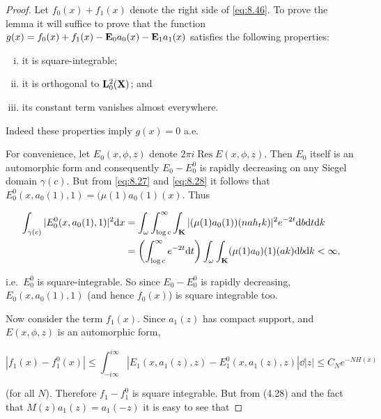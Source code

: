 \begin{proof}

Let $f_{0}(x) + f_{1}(x)$ denote the right side of \eqref{eq:8.46}. To prove the lemma it will suffice to prove that the function $g(x) = f_{0}(x) + f_{1}(x) - \mathbf{E}_{0}a_{0}(x) - \mathbf{E}_{1}a_{1}(x)$ satisfies the following properties:

\begin{enumerate}[(i)]

\item it is square-integrable;

\item it is orthogonal to $\mathbf{L}_{0}^{2}(\mathbf{X})$; and

\item its constant term vanishes almost everywhere.

\end{enumerate}

Indeed these properties imply $g(x) = 0$ a.e.

For convenience, let $E_{0}(x,\phi,z)$ denote $2\pi i\operatorname{Res}E(x,\phi,z)$. Then $E_{0}$ itself is an automorphic form and consequently $E_{0} - E_{0}^{0}$ is rapidly decreasing on any Siegel domain $\gamma(c)$. But from \eqref{eq:8.27} and \eqref{eq:8.28} it follows that $E_{0}^{0}(x,a_{0}(1),1) = (\mu(1)a_{0}(1)(x)$. Thus

\[
\begin{aligned}
\int_{\gamma(c)} |E_{0}^{0}(x,a_{0}(1),1)|^{2} \mathrm{d} x &= \int_{\omega}\int_{\log c}^{\infty}\int_{\mathbf{K}} |(\mu(1)a_{0}(1))(na h_{t} k)|^{2}e^{-2t} \mathrm{d} b \mathrm{d} t \mathrm{d} k\\
&= \left(\int_{\log c}^{\infty} e^{-2t} \mathrm{d} t\right)\int_{\omega}\int_{\mathbf{K}} (\mu(1)a_{0})(1)(ak) \mathrm{d} b \mathrm{d} k < \infty,
\end{aligned}
\]

i.e.\ $E_{0}^{0}$ is square-integrable. So since $E_{0} - E_{0}^{0}$ is rapidly decreasing, $E_{0}(x,a_{0}(1),1)$ (and hence $f_{0}(x)$) is square integrable too.

Now consider the term $f_{1}(x)$. Since $a_{1}(z)$ has compact support, and $E(x,\phi,z)$ is an automorphic form,

\[
|f_{1}(x) - f_{1}^{0}(x)| \leq \int_{-i\infty}^{i\infty} \left|E_{1}(x,a_{1}(z),z) - E_{1}^{0}(x,a_{1}(z),z)\right| \dd|z| \leq C_{N}e^{-NH(x)}
\]

(for all $N$). Therefore $f_{1} - f_{1}^{0}$ is square integrable. But from (4.28) and the fact that $M(z)a_{1}(z) = a_{1}(-z)$ it is easy to see that


\end{proof}
